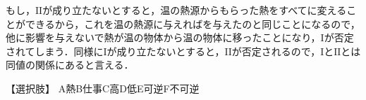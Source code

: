 \hspace{1zw}もし，$\mathrm{I\!I}$が成り立たないとすると，温の熱源からもらった熱をすべてに変えることができるから，これを温の熱源に与えればを与えたのと同じことになるので，他に影響を与えないで熱が温の物体から温の物体に移ったことになり，$\mathrm{I}$が否定されてしまう．同様に$\mathrm{I}$が成り立たないとすると，$\mathrm{I\!I}$が否定されるので，$\mathrm{I}$と$\mathrm{I\!I}$とは同値の関係にあると言える．

\begin{itembox}[l]{【選択肢】}
\noindent\hspace*{1zw}A\hspace{1zw}熱\hfill B\hspace{1zw}仕事\hfill C\hspace{1zw}高\hfill D\hspace{1zw}低\hfill E\hspace{1zw}可逆\hfill F\hspace{1zw}不可逆\hspace*{1zw}
\end{itembox}
